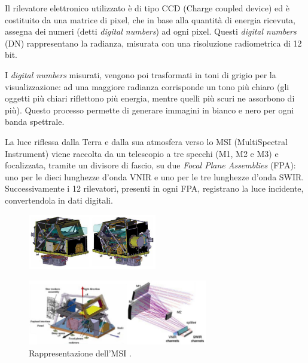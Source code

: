 Il rilevatore elettronico utilizzato è di tipo CCD (Charge coupled device) 
ed è costituito da una matrice di pixel, che in base alla quantità di energia 
ricevuta, assegna dei numeri (detti \textit{digital numbers}) ad ogni pixel. 
Questi \textit{digital numbers} (DN) rappresentano la radianza, 
misurata con una risoluzione radiometrica di 12 bit.

I \textit{digital numbers} misurati, vengono poi trasformati in toni di grigio 
per la visualizzazione: ad una maggiore radianza corrisponde un tono più chiaro 
(gli oggetti più chiari riflettono più energia, mentre quelli più scuri 
ne assorbono di più). 
Questo processo permette di generare immagini in bianco e nero per ogni banda spettrale.

La luce riflessa dalla Terra e dalla sua atmosfera verso lo 
MSI (MultiSpectral Instrument) viene raccolta da un telescopio a tre specchi (M1, M2 e M3) e 
focalizzata, tramite un divisore di fascio, su due \textit{Focal Plane Assemblies} (FPA): 
uno per le dieci lunghezze d'onda VNIR e uno per le tre lunghezze d'onda SWIR.
Successivamente i 12 rilevatori, presenti in ogni FPA, registrano la luce incidente, 
convertendola in dati digitali\cite{ALL_ABOUT_SENTINEL2}. 

\begin{figure}[H]
    \centering
    \includegraphics[width=0.5\textwidth]{Immagini/Satelliti/struttura_sentinel2_1.png}
\end{figure}

\begin{figure}[H]
    \centering
    \includegraphics[width=0.7\textwidth]{Immagini/Satelliti/struttura_sentinel2_2.png}
    \caption{Rappresentazione dell'MSI \cite{ALL_ABOUT_SENTINEL2}.}
\end{figure}


